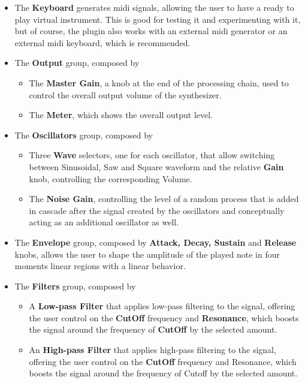 \documentclass{article}
\begin{document}
\begin{itemize}
    \item The \textbf{Keyboard} generates midi signals, allowing the user to have a ready to play virtual instrument. This is good for testing it and experimenting with it, but of course, the plugin also works with an external midi generator or an external midi keyboard, which is recommended.   \item The \textbf{Output} group, composed by\:
    \begin{itemize}
        \item The \textbf{Master Gain}, a knob at the end of the processing chain, used to control the overall output volume of the synthesizer.
        \item The \textbf{Meter}, which shows the overall output level.
   \end{itemize}
   \item The \textbf{Oscillators} group, composed by\:
    \begin{itemize}
        \item Three \textbf{Wave} selectors, one for each oscillator, that allow switching between Sinusoidal, Saw and Square waveform and the relative \textbf{Gain} knob, controlling the corresponding Volume.
        \item The \textbf{Noise Gain}, controlling the level of a random process that is added in cascade after the signal created by the oscillators and conceptually acting as an additional oscillator as well.
   \end{itemize}
   \item The \textbf{Envelope} group, composed by \textbf{Attack, Decay, Sustain} and \textbf{Release} knobs, allows the user to shape the amplitude of the played note in four moments linear regions with a linear behavior.
   \item The \textbf{Filters} group, composed by\:
       \begin{itemize}
        \item A \textbf{Low-pass Filter} that applies low-pass filtering to the signal, offering the user control on the \textbf{CutOff} frequency and \textbf{Resonance}, which boosts the signal around the frequency of \textbf{CutOff} by the selected amount.
        \item An \textbf{High-pass Filter} that applies high-pass filtering to the signal, offering the user control on the \textbf{CutOff} frequency and Resonance, which boosts the signal around the frequency of Cutoff by the selected amount. 

\end{itemize}
\end{itemize}
\end{document}
